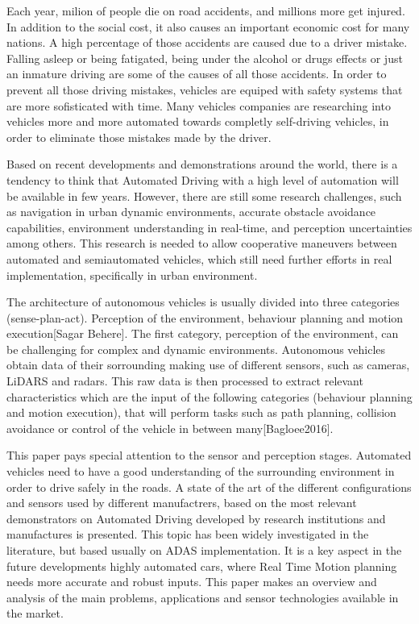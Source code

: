 

Each year, milion of people die on road accidents, and millions more get injured. In addition to the social cost, it also causes an important economic cost for many nations. A high percentage of those accidents are caused due to a driver mistake. Falling asleep or being fatigated, being under the alcohol or drugs effects or just an inmature driving are some of the causes of all those accidents. In order to prevent all those driving mistakes, vehicles are equiped with safety systems that are more sofisticated with time. Many vehicles companies are researching into vehicles more and more automated towards completly self-driving vehicles, in order to eliminate those mistakes made by the driver.

Based on recent developments and demonstrations around the world, there is a tendency to think that Automated Driving with a high level of automation will be available in few years. However, there are still some research challenges, such as navigation in urban dynamic environments, accurate obstacle avoidance capabilities, environment understanding in real-time, and perception uncertainties among others. This research is needed to allow cooperative maneuvers between automated and semiautomated vehicles, which still need further efforts in real implementation, specifically in urban environment. 


The architecture of autonomous vehicles is usually divided into three categories (sense-plan-act). Perception of the environment, behaviour planning and motion execution[Sagar Behere]. The first category, perception of the environment, can be challenging for complex and dynamic environments. Autonomous vehicles obtain data of their sorrounding making use of different sensors, such as cameras, LiDARS and radars. This raw data is then processed to extract relevant characteristics which are the input of the following categories (behaviour planning and motion execution), that will perform tasks such as path planning, collision avoidance or control of the vehicle in between many[Bagloee2016].

This paper pays special attention to the sensor and perception stages. Automated vehicles need to have a good understanding of the surrounding environment in order to drive safely in the roads. A state of the art of the different configurations and sensors used by different manufactrers, based on the most relevant demonstrators on Automated Driving developed by research institutions and manufactures is presented. This topic has been widely investigated in the literature, but based usually on ADAS implementation. It is a key aspect in the future developments highly automated cars, where Real Time Motion planning needs more accurate and robust inputs. This paper makes an overview and analysis of the main problems, applications and sensor technologies available in the market.

